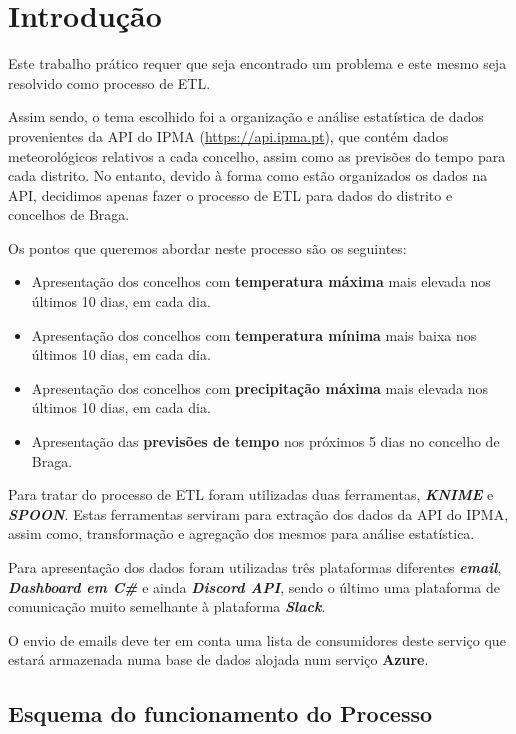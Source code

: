 \chapter{Introdução}

Este trabalho prático requer que seja encontrado um problema e este mesmo seja resolvido como processo de ETL. 

Assim sendo, o tema escolhido foi a organização e análise estatística de dados provenientes da API do IPMA (\url{https://api.ipma.pt}), que contém dados meteorológicos relativos a cada concelho, assim como as previsões do tempo para cada distrito. No entanto, devido à forma como estão organizados os dados na API, decidimos apenas fazer o processo de ETL para dados do distrito e concelhos de Braga.

Os pontos que queremos abordar neste processo são os seguintes:

\begin{itemize}
    \item Apresentação dos concelhos com \textbf{temperatura máxima} mais elevada nos últimos 10 dias, em cada dia.
    \item Apresentação dos concelhos com \textbf{temperatura mínima} mais baixa nos últimos 10 dias, em cada dia.
    \item Apresentação dos concelhos com \textbf{precipitação máxima} mais elevada nos últimos 10 dias, em cada dia.
    \item Apresentação das \textbf{previsões de tempo} nos próximos 5 dias no concelho de Braga.
\end{itemize}

Para tratar do processo de ETL foram utilizadas duas ferramentas, \textbf{\textit{KNIME}} e \textbf{\textit{SPOON}}. Estas ferramentas serviram para extração dos dados da API do IPMA, assim como, transformação e agregação dos mesmos para análise estatística.

Para apresentação dos dados foram utilizadas três plataformas diferentes \textbf{\textit{email}}, \textbf{\textit{Dashboard em C\#}} e ainda \textbf{\textit{Discord API}}, sendo o último uma plataforma de comunicação muito semelhante à plataforma \textbf{\textit{Slack}}.

O envio de emails deve ter em conta uma lista de consumidores deste serviço que estará armazenada numa base de dados alojada num serviço \textbf{Azure}.


\section*{Esquema do funcionamento do Processo}

